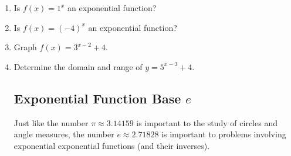 


\begin{enumerate}

\item Is $f(x)=1^x$ an exponential function?\\[.5in]



\item Is $f(x)=(-4)^x$ an exponential function?\\


\newpage
\item Graph $f(x)=3^{x-2}+4.$


\item Determine the domain and range of $y=5^{x-3}+4$.  \\[1in]





\subsection{Exponential Function Base $e$} 
Just like the number $\pi \approx 3.14159$ is important to the study
of circles and angle measures, the number $e \approx 2.71828$ is
important to problems involving exponential exponential functions (and
their inverses).


\end{enumerate}
